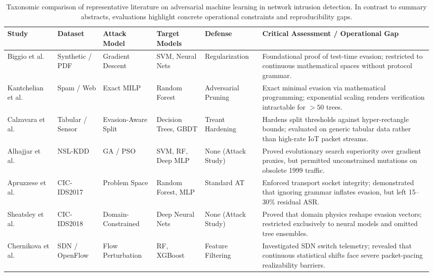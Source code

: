 \documentclass[iicol,pdflatex,sn-mathphys-num]{sn-jnl}
\begin{document}
\begin{table}[t]
\centering
\footnotesize
\renewcommand{\arraystretch}{0.95}
\caption{Taxonomic comparison of representative literature on adversarial machine learning in network intrusion detection. In contrast to summary abstracts, evaluations highlight concrete operational constraints and reproducibility gaps.}
\label{tab:related_work}
\begin{tabularx}{\textwidth}{l p{1.8cm} p{2.2cm} p{2.2cm} p{2.1cm} X}
\toprule
\textbf{Study} & \textbf{Dataset} & \textbf{Attack Model} & \textbf{Target Models} & \textbf{Defense} & \textbf{Critical Assessment / Operational Gap} \\
\midrule
Biggio et al.~\cite{biggio2013evasion} & Synthetic / PDF & Gradient Descent & SVM, Neural Nets & Regularization & Foundational proof of test-time evasion; restricted to continuous mathematical spaces without protocol grammar. \\
Kantchelian et al.~\cite{kantchelian2016evasion} & Spam / Web & Exact MILP & Random Forest & Adversarial Pruning & Exact minimal evasion via mathematical programming; exponential scaling renders verification intractable for $>50$ trees. \\
Calzavara et al.~\cite{calzavara2020treant} & Tabular / Sensor & Evasion-Aware Split & Decision Trees, GBDT & Treant Hardening & Hardens split thresholds against hyper-rectangle bounds; evaluated on generic tabular data rather than high-rate IoT packet streams. \\
Alhajjar et al.~\cite{alhajjar2021adversarial} & NSL-KDD & GA / PSO & SVM, RF, Deep MLP & None (Attack Study) & Proved evolutionary search superiority over gradient proxies, but permitted unconstrained mutations on obsolete 1999 traffic. \\
Apruzzese et al.~\cite{apruzzese2022modeling,apruzzese2023real} & CIC-IDS2017 & Problem Space & Random Forest, MLP & Standard AT & Enforced transport socket integrity; demonstrated that ignoring grammar inflates evasion, but left 15--30\% residual ASR. \\
Sheatsley et al.~\cite{sheatsley2022space} & CIC-IDS2018 & Domain-Constrained & Deep Neural Nets & None (Attack Study) & Proved that domain physics reshape evasion vectors; restricted exclusively to neural models and omitted tree ensembles. \\
Chernikova et al.~\cite{chernikova2023problem} & SDN / OpenFlow & Flow Perturbation & RF, XGBoost & Feature Filtering & Investigated SDN switch telemetry; revealed that continuous statistical shifts face severe packet-pacing realizability barriers. \\

\end{tabularx}
\end{table}
\end{document}
